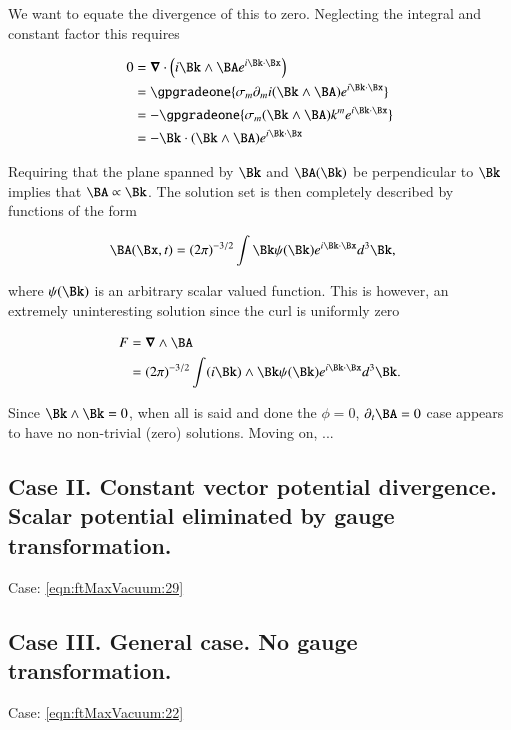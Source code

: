 We want to equate the divergence of this to zero.  Neglecting the integral and constant factor this requires

\begin{align*}
0 
&= 
\spacegrad \cdot \left( i \Bk \wedge \BA e^{i\Bk \cdot \Bx} \right) \\
&= 
\gpgradeone{ \sigma_m \partial_m i (\Bk \wedge \BA) e^{i\Bk \cdot \Bx} } \\
&= 
-\gpgradeone{ \sigma_m (\Bk \wedge \BA) k^m e^{i\Bk \cdot \Bx} } \\
&= 
-\Bk \cdot (\Bk \wedge \BA) e^{i\Bk \cdot \Bx} \\
\end{align*}

Requiring that the plane spanned by $\Bk$ and $\BA(\Bk)$ be perpendicular to $\Bk$ implies that $\BA \propto \Bk$.  The solution set is then completely described by functions of the form

\begin{align}\label{eqn:ftMaxVacuum:53}
\BA(\Bx, t) &= (2 \pi)^{-3/2} \int \Bk \psi(\Bk) e^{i \Bk \cdot \Bx } d^3 \Bk,
\end{align}

where $\psi(\Bk)$ is an arbitrary scalar valued function.  This is however, an extremely uninteresting solution since the curl is uniformly zero

\begin{align*}
F 
&= \spacegrad \wedge \BA \\
&= (2 \pi)^{-3/2} \int (i \Bk) \wedge \Bk \psi(\Bk) e^{i \Bk \cdot \Bx } d^3 \Bk.
\end{align*}

Since $\Bk \wedge \Bk = 0$, when all is said and done the $\phi = 0$, $\partial_t \BA = 0$ case appears to have no non-trivial (zero) solutions.  Moving on, ...

\subsection{Case II.  Constant vector potential divergence.  Scalar potential eliminated by gauge transformation.}

Case: \autoref{eqn:ftMaxVacuum:29}

\subsection{Case III.  General case.  No gauge transformation.}

Case: \autoref{eqn:ftMaxVacuum:22}

